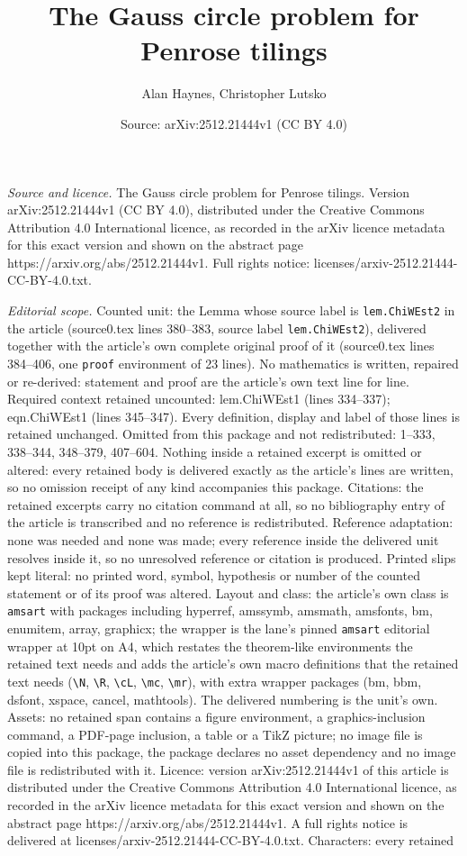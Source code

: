 \documentclass[10pt,a4paper]{amsart}
\title[The Gauss circle problem for Penrose tilings]{The Gauss circle problem for Penrose tilings}
\author{Alan Haynes, Christopher Lutsko}
\date{Source: arXiv:2512.21444v1 (CC BY 4.0)}
\begin{document}
\maketitle

\noindent\emph{Source and licence.} The Gauss circle problem for Penrose tilings. Version arXiv:2512.21444v1 (CC BY 4.0), distributed under the Creative Commons Attribution 4.0 International licence, as recorded in the arXiv licence metadata for this exact version and shown on the abstract page https://arxiv.org/abs/2512.21444v1. Full rights notice: licenses/arxiv-2512.21444-CC-BY-4.0.txt.\par\smallskip

\noindent\textit{Editorial scope.} Counted unit: the Lemma whose source label is \texttt{lem.ChiWEst2} in the article (source0.tex lines 380--383, source label \texttt{lem.ChiWEst2}), delivered together with the article's own complete original proof of it (source0.tex lines 384--406, one \texttt{proof} environment of 23 lines). No mathematics is written, repaired or re-derived: statement and proof are the article's own text line for line. Required context retained uncounted: lem.ChiWEst1 (lines 334--337); eqn.ChiWEst1 (lines 345--347). Every definition, display and label of those lines is retained unchanged. Omitted from this package and not redistributed: 1--333, 338--344, 348--379, 407--604. Nothing inside a retained excerpt is omitted or altered: every retained body is delivered exactly as the article's lines are written, so no omission receipt of any kind accompanies this package. Citations: the retained excerpts carry no citation command at all, so no bibliography entry of the article is transcribed and no reference is redistributed. Reference adaptation: none was needed and none was made; every reference inside the delivered unit resolves inside it, so no unresolved reference or citation is produced. Printed slips kept literal: no printed word, symbol, hypothesis or number of the counted statement or of its proof was altered. Layout and class: the article's own class is \texttt{amsart} with packages including hyperref, amssymb, amsmath, amsfonts, bm, enumitem, array, graphicx; the wrapper is the lane's pinned \texttt{amsart} editorial wrapper at 10pt on A4, which restates the theorem-like environments the retained text needs and adds the article's own macro definitions that the retained text needs (\texttt{\textbackslash N}, \texttt{\textbackslash R}, \texttt{\textbackslash cL}, \texttt{\textbackslash mc}, \texttt{\textbackslash mr}), with extra wrapper packages (bm, bbm, dsfont, xspace, cancel, mathtools). The delivered numbering is the unit's own. Assets: no retained span contains a figure environment, a graphics-inclusion command, a PDF-page inclusion, a table or a TikZ picture; no image file is copied into this package, the package declares no asset dependency and no image file is redistributed with it. Licence: version arXiv:2512.21444v1 of this article is distributed under the Creative Commons Attribution 4.0 International licence, as recorded in the arXiv licence metadata for this exact version and shown on the abstract page https://arxiv.org/abs/2512.21444v1. A full rights notice is delivered at licenses/arxiv-2512.21444-CC-BY-4.0.txt. Characters: every retained 
\end{document}

